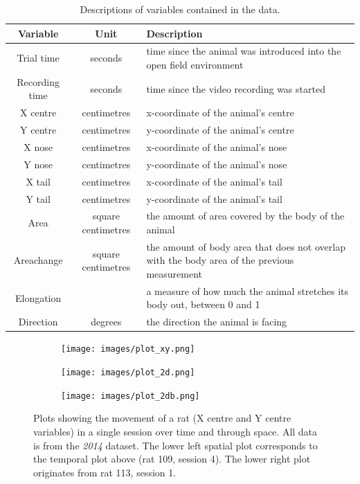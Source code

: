 \documentclass[conference,a4paper,twoside]{IEEEtran}
\begin{document}
\begin{table}[!t]
        \caption{Descriptions of variables contained in the data.}
        \label{tab:variables}
        \centering
        \begin{tabular}{ccl}
                Variable & Unit & Description \\
                \hline
                Trial time & seconds & time since the animal was introduced into the open field environment \\
                Recording time & seconds & time since the video recording was started \\
                X centre & centimetres & x-coordinate of the animal's centre \\
                Y centre & centimetres & y-coordinate of the animal's centre \\
                X nose & centimetres & x-coordinate of the animal's nose \\
                Y nose & centimetres & y-coordinate of the animal's nose \\
                X tail & centimetres & x-coordinate of the animal's tail \\
                Y tail & centimetres & y-coordinate of the animal's tail \\
                Area & square centimetres & the amount of area covered by the body of the animal \\
                Areachange & square centimetres & the amount of body area that does not overlap with the body area of the previous measurement \cite{juszczak2008computer} \\
                Elongation & & a measure of how much the animal stretches its body out, between 0 and 1 \\
                Direction & degrees & the direction the animal is facing \\
        \end{tabular}
\end{table}

\begin{figure}
    \centering
    \begin{subfigure}{}
        \texttt{[image: images/plot\_xy.png]}
    \end{subfigure}
    \hfill
    \begin{subfigure}{}
        \texttt{[image: images/plot\_2d.png]}
    \end{subfigure}
    \begin{subfigure}{}
        \texttt{[image: images/plot\_2db.png]}
    \end{subfigure}
    \caption{Plots showing the movement of a rat (X centre and Y centre variables) in a single session over time and through space. All data is from the \emph{2014} dataset. The lower left spatial plot corresponds to the temporal plot above (rat 109, session 4). The lower right plot originates from rat 113, session 1.}
    \label{fig:plot_xy}
\end{figure}
\end{document}
